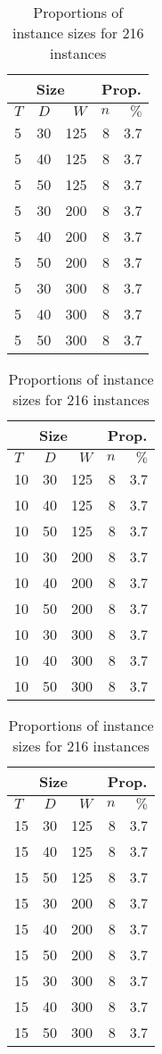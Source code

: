 \documentclass[../../thesis.tex]{subfiles}
\begin{document}
\begin{table}[H]
  \caption{Proportions of instance sizes for 216 instances}
  \label{instances:proportions}
  \centering
  \begin{tabular}[t]{|lcr | r r|}
    \hline
    \multicolumn{3}{|c|}{Size} & \multicolumn{2}{|c|}{Prop.} \\
    \hline 
    $T$ & $D$ & $W$ & $n$ & $\%$ \\
    \hline 
    5 & 30 & 125 & 8 & 3.7 \\ 
    5 & 40 & 125 & 8 & 3.7 \\ 
    5 & 50 & 125 & 8 & 3.7 \\ 
    5 & 30 & 200 & 8 & 3.7 \\ 
    5 & 40 & 200 & 8 & 3.7 \\ 
    5 & 50 & 200 & 8 & 3.7 \\ 
    5 & 30 & 300 & 8 & 3.7 \\ 
    5 & 40 & 300 & 8 & 3.7 \\ 
    5 & 50 & 300 & 8 & 3.7 \\ 
    \hline
  \end{tabular}
  \hfill
  \begin{tabular}[t]{|lcr | r r|}
    \hline
    \multicolumn{3}{|c|}{Size} & \multicolumn{2}{|c|}{Prop.} \\
    \hline 
    $T$ & $D$ & $W$ & $n$ & $\%$ \\
    \hline 
    10 & 30 & 125 & 8 & 3.7 \\ 
    10 & 40 & 125 & 8 & 3.7 \\ 
    10 & 50 & 125 & 8 & 3.7\\ 
    10 & 30 & 200 & 8 & 3.7\\ 
    10 & 40 & 200 & 8 & 3.7\\ 
    10 & 50 & 200 & 8 & 3.7\\ 
    10 & 30 & 300 & 8 & 3.7\\ 
    10 & 40 & 300 & 8 & 3.7\\ 
    10 & 50 & 300 & 8 & 3.7\\ 
    \hline
  \end{tabular}
  \hfill
  \begin{tabular}[t]{|lcr | r r|}
    \hline
    \multicolumn{3}{|c|}{Size} & \multicolumn{2}{|c|}{Prop.} \\
    \hline 
    $T$ & $D$ & $W$ & $n$ & $\%$ \\
    \hline 
    15 & 30 & 125 & 8 & 3.7\\ 
    15 & 40 & 125 & 8 & 3.7\\ 
    15 & 50 & 125 & 8 & 3.7\\ 
    15 & 30 & 200 & 8 & 3.7\\ 
    15 & 40 & 200 & 8 & 3.7\\ 
    15 & 50 & 200 & 8 & 3.7\\ 
    15 & 30 & 300 & 8 & 3.7\\ 
    15 & 40 & 300 & 8 & 3.7\\ 
    15 & 50 & 300 & 8 & 3.7\\ 
    \hline
  \end{tabular}
\end{table}
\end{document}
